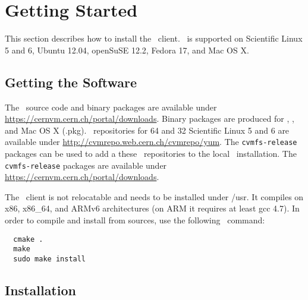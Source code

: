 \chapter{Getting Started}
\label{sct:start}

This section describes how to install the \cvmfs\ client.
\cvmfs\ is supported on Scientific Linux 5 and 6, Ubuntu 12.04, openSuSE 12.2, Fedora 17, and Mac OS X.

\section{Getting the Software}
The \cvmfs\ source code and binary packages are available under \url{https://cernvm.cern.ch/portal/downloads}.
Binary packages are produced for \rpm, \dpkg, and Mac OS X (.pkg).
\yum\ repositories for \SI{64}{\bit} and \SI{32}{\bit} Scientific Linux 5 and 6 are available under \url{http://cvmrepo.web.cern.ch/cvmrepo/yum}.
The \texttt{cvmfs-release} packages can be used to add a these \yum\ repositories to the local \yum\ installation.
The \texttt{cvmfs-release} packages are available under \url{https://cernvm.cern.ch/portal/downloads}.

The \cvmfs\ client is not relocatable and needs to be installed under /usr.
It compiles on x86, x86\_64, and ARMv6 architectures (on ARM it requires at least gcc 4.7).
In order to compile and install from sources, use the following \cmake\ command:
\begin{verbatim}
  cmake .
  make
  sudo make install
\end{verbatim}

\section{Installation}
